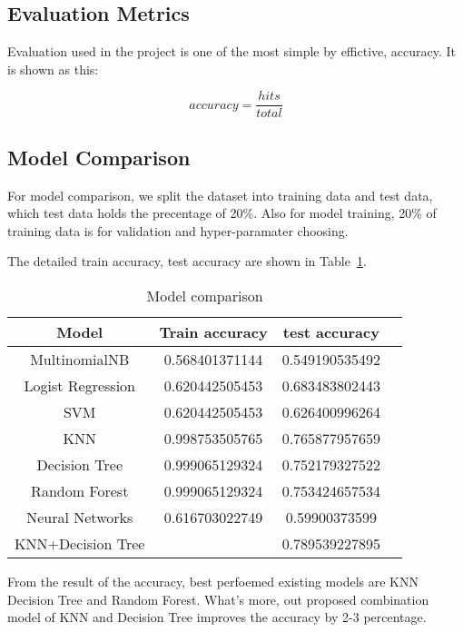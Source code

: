 \documentclass{article}
\begin{document}
\subsection{Evaluation Metrics}

Evaluation used in the project is one of the most simple by effictive, accuracy. It is shown as this:

$$
accuracy=\frac{hits}{total}
$$

\subsection{Model Comparison}

For model comparison, we split the dataset into training data and test data, which test data holds the precentage of 20\%. Also for model training, 20\% of training data is for validation and hyper-paramater choosing.

The detailed train accuracy, test accuracy are shown in Table~\ref{tab: Model_comparison}.

\begin{table}[htbp]
\centering
\begin{tabular}{cccc}
    \hline
    Model & Train accuracy & test accuracy\\
    \hline
    MultinomialNB & 0.568401371144 & 0.549190535492\\
    \hline
    Logist Regression & 0.620442505453 & 0.683483802443\\
    \hline
    SVM & 0.620442505453 & 0.626400996264\\
    \hline
    KNN & 0.998753505765 & 0.765877957659\\
    \hline
    Decision Tree & 0.999065129324 & 0.752179327522\\
    \hline
    Random Forest & 0.999065129324 & 0.753424657534\\
    \hline
    Neural Networks & 0.616703022749 & 0.59900373599\\
    \hline
    KNN+Decision Tree &  & 0.789539227895\\
    \hline
    \end{tabular}
\caption{Model comparison}
\label{tab: Model_comparison}
\end{table}

From the result of the accuracy, best perfoemed existing models are KNN Decision Tree and Random Forest. What's more, out proposed combination model of KNN and Decision Tree improves the accuracy by 2-3 percentage.




\end{document}
